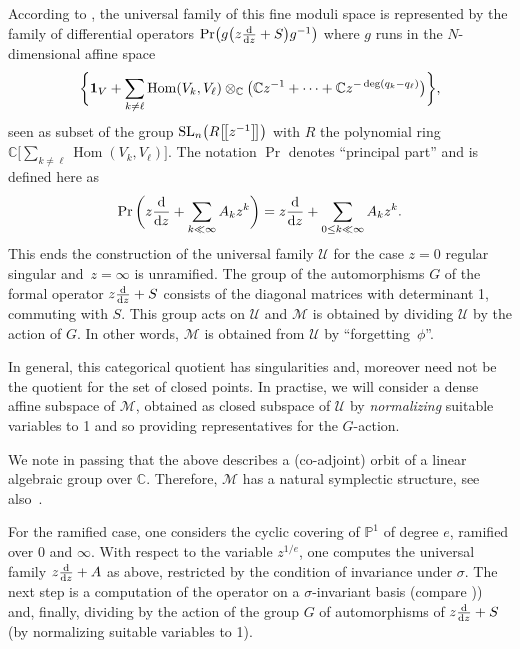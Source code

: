 \documentclass[pdftex]{sigma}
\numberwithin{equation}{section}
\begin{document}
 According to \cite[Corollary 12.15 and its proof]{vdP-Si}, the universal family of this fine moduli space is represented by the
family of differential operators $\operatorname{Pr}\bigl(g\bigl(z\frac{{\rm d}}{{\rm d}z}+S\bigr)g^{-1}\bigr)$ where $g$ runs in the $N$-dimensional affine space
\[ \bigg\{{\bf 1}_V+\sum _{k\neq \ell} \operatorname{Hom}(V_k,V_\ell)\otimes _{\mathbb{C}}\bigl(\mathbb{C}z^{-1}+\cdots +\mathbb{C}z^{-\deg (q_k-q_\ell )} \bigr)\bigg\},\]
seen as subset of the group ${\rm SL}_n\bigl(R\bigl[\!\bigl[z^{-1}\bigr]\!\bigr]\bigr)$ with
$R$ the polynomial ring $\mathbb{C}\bigl[\sum _{k\neq \ell}\operatorname{Hom}(V_k,V_{\ell})\bigr]$.
The notation $\operatorname{Pr}$ denotes ``principal part'' and is defined here as
\[\operatorname{Pr}\bigg(z\frac{{\rm d}}{{\rm d}z}+\sum _{k \ll \infty }A_kz^k\bigg)=z\frac{{\rm d}}{{\rm d}z}+\sum _{0 \leq k \ll \infty}A_kz^k.\]
This ends the construction of the universal family $\mathcal{U}$ for the case $z=0$ regular singular and~${z=\infty}$ is unramified.
The group of the automorphisms $G$ of the formal operator $z\frac{{\rm d}}{{\rm d}z}+S$ consists of the diagonal matrices with
 determinant 1, commuting with $S$. This group acts on $\mathcal{U}$ and $\mathcal{M}$ is obtained by dividing $\mathcal{U}$ by the action of $G$.
In other words, $\mathcal{M}$ is obtained from $\mathcal{U}$ by ``forgetting~$\phi$''.

 In general, this categorical quotient has singularities and, moreover need not be the quotient for the set of closed points.
In practise, we will consider a dense affine subspace of $\mathcal{M}$, obtained as closed subspace of $\mathcal{U}$ by
 {\it normalizing} suitable variables to 1 and so providing representatives for the $G$-action.

We note in passing that the above describes a (co-adjoint) orbit of a linear algebraic group over $\mathbb{C}$. Therefore,
$\mathcal{M}$ has a natural symplectic structure, see also~\cite{Bo}.

For the ramified case, one considers the cyclic covering of $\mathbb{P}^1$ of degree $e$, ramified over $0$ and $\infty$.
With respect to the variable $z^{1/e}$, one computes the universal family $z\frac{{\rm d}}{{\rm d}z}+A$ as above, restricted by the
condition of invariance under $\sigma$. The next step
is a computation of the operator on a $\sigma$-invariant basis (compare \cite[Section~12.5]{vdP-Si})) and, finally, dividing by
the action of the group $G$ of automorphisms of $z\frac{{\rm d}}{{\rm d}z}+S$ (by normalizing suitable variables to 1).
\end{document}
